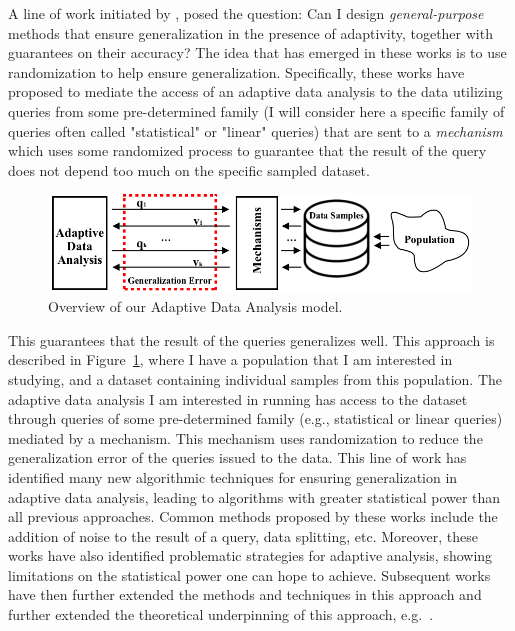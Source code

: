 A line of work initiated by \cite{DworkFHPRR15}, \cite{HardtU14} posed the question: 
Can I design \emph{general-purpose} methods that ensure generalization in the presence of adaptivity, together with guarantees on their accuracy? 
The idea that has emerged in these works is to use randomization to help ensure generalization. 
Specifically, these works have proposed to mediate the access of an adaptive data analysis to the data utilizing queries from some pre-determined family (I will consider here a specific family of queries often called "statistical" or "linear" queries) that are sent to a 
\emph{mechanism} which uses some randomized process to guarantee that the result of the query does not depend too much on the specific
sampled dataset. 
%
\begin{figure}
 \centering
 \includegraphics[width=0.7\columnwidth]{figures/data_analysis_model.png}
 \caption{Overview of our Adaptive Data Analysis model.}
 \label{fig:adaptivity-model-overview}
\vspace{-0.5cm}
\end{figure}
This guarantees that the result of the queries generalizes well. 
This approach is described in Figure~\ref{fig:adaptivity-model-overview}, where
I have a population that I am interested in studying, and a dataset containing individual samples from this population. The adaptive data analysis I am interested in running has access to the dataset through queries of some pre-determined family (e.g., statistical or linear queries) mediated by a mechanism. 
This mechanism uses randomization to reduce the generalization error of the queries issued to the data.
This line of work has identified many new algorithmic techniques for ensuring generalization in adaptive data analysis, leading to algorithms with greater statistical power than all previous approaches. 
Common methods proposed by these works include the addition of noise to the result of a query, data splitting, etc. 
Moreover, these works have also identified problematic strategies for adaptive analysis, showing limitations on the statistical power one can hope to achieve. 
Subsequent works have then further extended the methods and techniques in this approach and further extended the theoretical underpinning of this approach, 
e.g.~\cite{dwork2015reusable,dwork2015generalization,BassilyNSSSU16,UllmanSNSS18,FeldmanS17,jung2019new,SteinkeZ20,RogersRSSTW20}.
%


